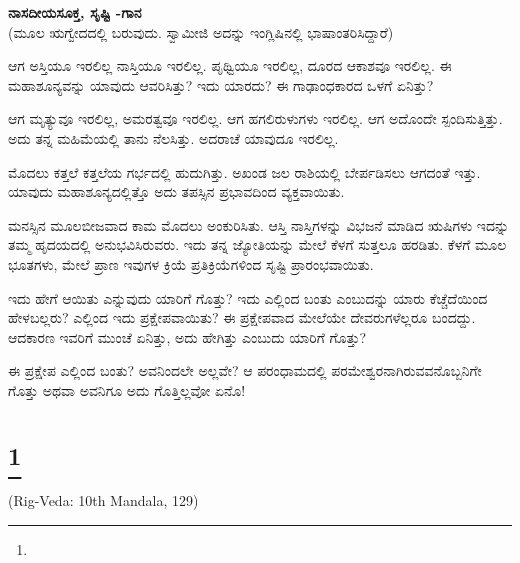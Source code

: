 \begin{myquote}
\end{myquote}

\selectkan

\begin{center}
\textbf{ನಾಸದೀಯಸೂಕ್ತ, ಸೃಷ್ಟಿ -ಗಾನ}\\(ಮೂಲ ಋಗ್ವೇದದಲ್ಲಿ ಬರುವುದು. ಸ್ವಾಮೀಜಿ ಅದನ್ನು ಇಂಗ್ಲಿಷಿನಲ್ಲಿ ಭಾಷಾಂತರಿಸಿದ್ದಾರೆ)
\end{center}

ಆಗ ಅಸ್ತಿಯೂ ಇರಲಿಲ್ಲ ನಾಸ್ತಿಯೂ ಇರಲಿಲ್ಲ. ಪೃಥ್ವಿಯೂ ಇರಲಿಲ್ಲ, ದೂರದ ಆಕಾಶವೂ ಇರಲಿಲ್ಲ. ಈ ಮಹಾಶೂನ್ಯವನ್ನು ಯಾವುದು ಆವರಿಸಿತ್ತು? ಇದು ಯಾರದು? ಈ ಗಾಢಾಂಧಕಾರದ ಒಳಗೆ ಏನಿತ್ತು?

ಆಗ ಮೃತ್ಯುವೂ ಇರಲಿಲ್ಲ, ಅಮರತ್ವವೂ ಇರಲಿಲ್ಲ. ಆಗ ಹಗಲಿರುಳುಗಳು ಇರಲಿಲ್ಲ. ಆಗ ಅದೊಂದೇ ಸ್ಪಂದಿಸುತ್ತಿತ್ತು. ಅದು ತನ್ನ ಮಹಿಮೆಯಲ್ಲಿ ತಾನು ನೆಲಸಿತ್ತು. ಅದರಾಚೆ ಯಾವುದೂ ಇರಲಿಲ್ಲ.

ಮೊದಲು ಕತ್ತಲೆ ಕತ್ತಲೆಯ ಗರ್ಭದಲ್ಲಿ ಹುದುಗಿತ್ತು. ಅಖಂಡ ಜಲ ರಾಶಿಯಲ್ಲಿ ಬೇರ್ಪಡಿಸಲು ಆಗದಂತೆ ಇತ್ತು. ಯಾವುದು ಮಹಾಶೂನ್ಯದಲ್ಲಿತ್ತೊ ಅದು ತಪಸ್ಸಿನ ಪ್ರಭಾವದಿಂದ ವ್ಯಕ್ತವಾಯಿತು.

ಮನಸ್ಸಿನ ಮೂಲಬೀಜವಾದ ಕಾಮ ಮೊದಲು ಅಂಕುರಿಸಿತು. ಆಸ್ತಿ ನಾಸ್ತಿಗಳನ್ನು ವಿಭಜನೆ ಮಾಡಿದ ಋಷಿಗಳು ಇದನ್ನು ತಮ್ಮ ಹೃದಯದಲ್ಲಿ ಅನುಭವಿಸಿರುವರು. ಇದು ತನ್ನ ಜ್ಯೋತಿಯನ್ನು ಮೇಲೆ ಕೆಳಗೆ ಸುತ್ತಲೂ ಹರಡಿತು. ಕೆಳಗೆ ಮೂಲ ಭೂತಗಳು, ಮೇಲೆ ಪ್ರಾಣ ಇವುಗಳ ಕ್ರಿಯೆ ಪ್ರತಿಕ್ರಿಯೆಗಳಿಂದ ಸೃಷ್ಟಿ ಪ್ರಾರಂಭವಾಯಿತು.

ಇದು ಹೇಗೆ ಆಯಿತು ಎನ್ನುವುದು ಯಾರಿಗೆ ಗೊತ್ತು? ಇದು ಎಲ್ಲಿಂದ ಬಂತು ಎಂಬುದನ್ನು ಯಾರು ಕೆಚ್ಚೆದೆಯಿಂದ ಹೇಳಬಲ್ಲರು? ಎಲ್ಲಿಂದ ಇದು ಪ್ರಕ್ಷೇಪವಾಯಿತು? ಈ ಪ್ರಕ್ಷೇಪವಾದ ಮೇಲೆಯೇ ದೇವರುಗಳೆಲ್ಲರೂ ಬಂದದ್ದು. ಆದಕಾರಣ ಇವರಿಗೆ ಮುಂಚೆ ಏನಿತ್ತು, ಅದು ಹೇಗಿತ್ತು ಎಂಬುದು ಯಾರಿಗೆ ಗೊತ್ತು?

ಈ ಪ್ರಕ್ಷೇಪ ಎಲ್ಲಿಂದ ಬಂತು? ಅವನಿಂದಲೇ ಅಲ್ಲವೇ? ಆ ಪರಂಧಾಮದಲ್ಲಿ ಪರಮೇಶ್ವರನಾಗಿರುವವನೊಬ್ಬನಿಗೇ ಗೊತ್ತು ಅಥವಾ ಅವನಿಗೂ ಅದು ಗೊತ್ತಿಲ್ಲವೋ ಏನೊ!

\selecteng

\chapter[THY LOVE I FEAR]{\protect\footnote{}}

\begin{center}
(Rig-Veda: 10th Mandala, 129)
\end{center}


